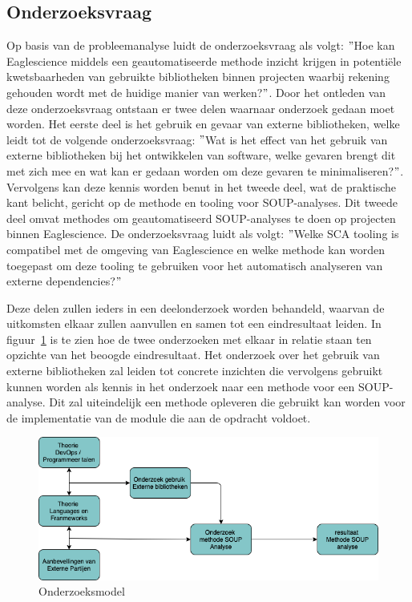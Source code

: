 \subsection{Onderzoeksvraag}\label{subsec:onderzoeksvraag-en-deelvragen}
Op basis van de probleemanalyse luidt de onderzoeksvraag als volgt: $"$Hoe kan Eaglescience middels een geautomatiseerde methode inzicht krijgen in potentiële kwetsbaarheden van gebruikte bibliotheken binnen projecten waarbij rekening gehouden wordt met de huidige manier van werken?$"$. Door het ontleden van deze onderzoeksvraag ontstaan er twee delen waarnaar onderzoek gedaan moet worden. Het eerste deel is het gebruik en gevaar van externe bibliotheken, welke leidt tot de volgende onderzoeksvraag: $"$Wat is het effect van het gebruik van externe bibliotheken bij het ontwikkelen van software, welke gevaren brengt dit met zich mee en wat kan er gedaan worden om deze gevaren te minimaliseren?$"$. Vervolgens kan deze kennis worden benut in het tweede deel, wat de praktische kant belicht, gericht op de methode en tooling voor SOUP-analyses. Dit tweede deel omvat methodes om geautomatiseerd SOUP-analyses te doen op projecten binnen Eaglescience. De onderzoeksvraag luidt als volgt: $"$Welke SCA tooling is compatibel met de omgeving van Eaglescience en welke methode kan worden toegepast om deze tooling te gebruiken voor het automatisch analyseren van externe dependencies?$"$

Deze delen zullen ieders in een deelonderzoek worden behandeld, waarvan de uitkomsten elkaar zullen aanvullen en samen tot een eindresultaat leiden. In figuur~\ref{fig:OnderzoeksModel} is te zien hoe de twee onderzoeken met elkaar in relatie staan ten opzichte van het beoogde eindresultaat. Het onderzoek over het gebruik van externe bibliotheken zal leiden tot concrete inzichten die vervolgens gebruikt kunnen worden als kennis in het onderzoek naar een methode voor een SOUP-analyse. Dit zal uiteindelijk een methode opleveren die gebruikt kan worden voor de implementatie van de module die aan de opdracht voldoet.

\begin{figure}
    \myfloatalign
    \includegraphics[width=12cm]{gfx/Onderzoekmodel}
    \caption{Onderzoeksmodel}
    \label{fig:OnderzoeksModel}
\end{figure}

